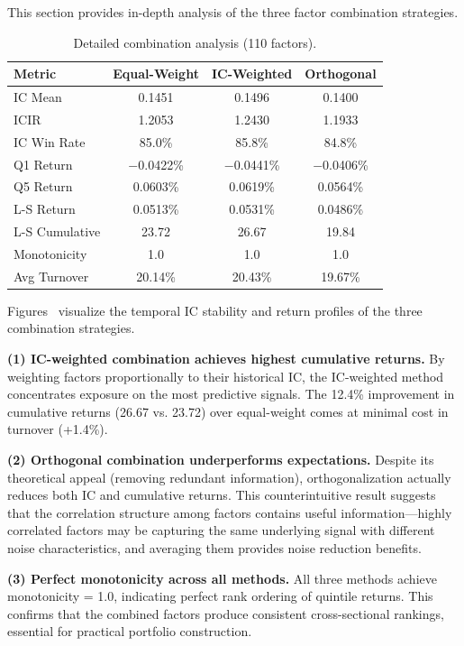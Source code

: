 \documentclass[sigconf]{acmart}
\begin{document}
This section provides in-depth analysis of the three factor combination strategies.

\begin{table}[h]
  \caption{Detailed combination analysis (110 factors).}
  \centering
  \begin{small}
  \begin{tabular}{lccc}
    \toprule
    Metric & Equal-Weight & IC-Weighted & Orthogonal \\
    \midrule
    IC Mean & 0.1451 & 0.1496 & 0.1400 \\
    ICIR & 1.2053 & 1.2430 & 1.1933 \\
    IC Win Rate & 85.0\% & 85.8\% & 84.8\% \\
    Q1 Return & $-$0.0422\% & $-$0.0441\% & $-$0.0406\% \\
    Q5 Return & 0.0603\% & 0.0619\% & 0.0564\% \\
    L-S Return & 0.0513\% & 0.0531\% & 0.0486\% \\
    L-S Cumulative & 23.72 & 26.67 & 19.84 \\
    Monotonicity & 1.0 & 1.0 & 1.0 \\
    Avg Turnover & 20.14\% & 20.43\% & 19.67\% \\
    \bottomrule
  \end{tabular}
  \end{small}
\end{table}


Figures~ visualize the temporal IC stability and return profiles of the three combination strategies.

\textbf{(1) IC-weighted combination achieves highest cumulative returns.}
By weighting factors proportionally to their historical IC, the IC-weighted method concentrates exposure on the most predictive signals.
The 12.4\% improvement in cumulative returns (26.67 vs. 23.72) over equal-weight comes at minimal cost in turnover (+1.4\%).

\textbf{(2) Orthogonal combination underperforms expectations.}
Despite its theoretical appeal (removing redundant information), orthogonalization actually reduces both IC and cumulative returns.
This counterintuitive result suggests that the correlation structure among factors contains useful information---highly correlated factors may be capturing the same underlying signal with different noise characteristics, and averaging them provides noise reduction benefits.

\textbf{(3) Perfect monotonicity across all methods.}
All three methods achieve monotonicity = 1.0, indicating perfect rank ordering of quintile returns.
This confirms that the combined factors produce consistent cross-sectional rankings, essential for practical portfolio construction.
\end{document}
